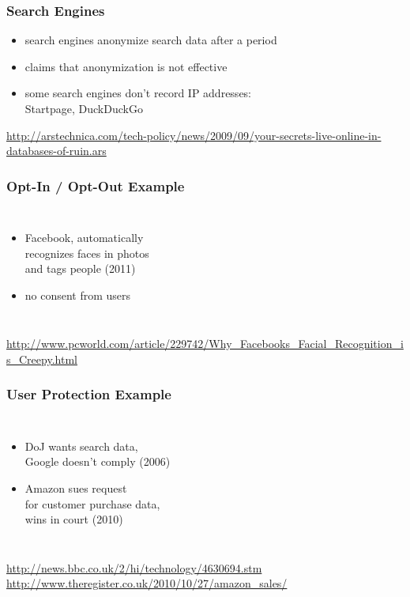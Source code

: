 \documentclass[dvipsnames]{beamer}
\theoremstyle{plain}
\begin{document}
\begin{frame}
  \frametitle{Search Engines}

  \begin{itemize}
    \item search engines anonymize search data after a period
    \item claims that anonymization is not effective

    \medskip
    \item some search engines don't record IP addresses:\\
      Startpage, DuckDuckGo
  \end{itemize}

  \medskip
  \tiny{\url{http://arstechnica.com/tech-policy/news/2009/09/your-secrets-live-online-in-databases-of-ruin.ars}}\\
\end{frame}

\begin{frame}
  \frametitle{Opt-In / Opt-Out Example}

  \begin{columns}

    \begin{itemize}
      \item Facebook, automatically\\
        recognizes faces in photos\\
        and tags people (2011)
      \item no consent from users
    \end{itemize}
  \end{columns}

  \medskip
  \tiny{\url{http://www.pcworld.com/article/229742/Why_Facebooks_Facial_Recognition_is_Creepy.html}}\\
\end{frame}

\begin{frame}
  \frametitle{User Protection Example}

  \begin{columns}

    \begin{itemize}
      \item DoJ wants search data,\\
        Google doesn't comply (2006)

      \pause
      \medskip
      \item Amazon sues request\\
        for customer purchase data,\\
        wins in court (2010)
    \end{itemize}
  \end{columns}

  \medskip
  \tiny{\url{http://news.bbc.co.uk/2/hi/technology/4630694.stm}}\\
  \smallskip
  \tiny{\url{http://www.theregister.co.uk/2010/10/27/amazon_sales/}}\\
\end{frame}
\end{document}
